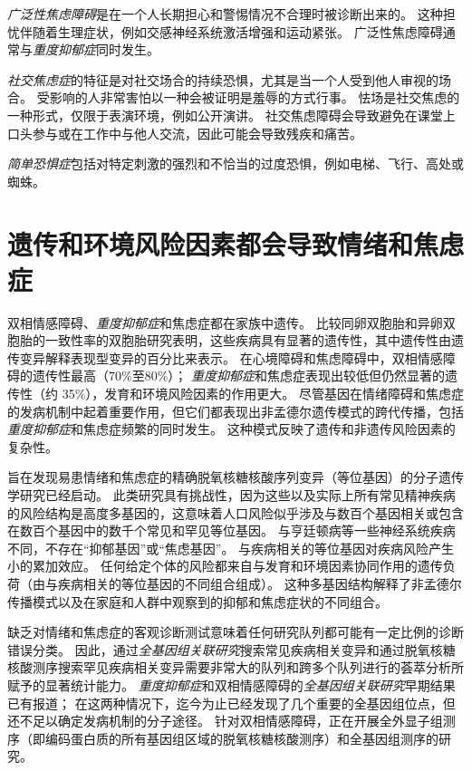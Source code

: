 \textit{广泛性焦虑障碍}是在一个人长期担心和警惕情况不合理时被诊断出来的。
这种担忧伴随着生理症状，例如交感神经系统激活增强和运动紧张。
广泛性焦虑障碍通常与\textit{重度抑郁症}同时发生。


\textit{社交焦虑症}的特征是对社交场合的持续恐惧，尤其是当一个人受到他人审视的场合。
受影响的人非常害怕以一种会被证明是羞辱的方式行事。
怯场是社交焦虑的一种形式，仅限于表演环境，例如公开演讲。
社交焦虑障碍会导致避免在课堂上口头参与或在工作中与他人交流，因此可能会导致残疾和痛苦。



\textit{简单恐惧症}包括对特定刺激的强烈和不恰当的过度恐惧，例如电梯、飞行、高处或蜘蛛。



\section{遗传和环境风险因素都会导致情绪和焦虑症}

双相情感障碍、\textit{重度抑郁症}和焦虑症都在家族中遗传。
比较同卵双胞胎和异卵双胞胎的一致性率的双胞胎研究表明，这些疾病具有显著的遗传性，其中遗传性由遗传变异解释表现型变异的百分比来表示。
在心境障碍和焦虑障碍中，双相情感障碍的遗传性最高（70\%至80\%）；
\textit{重度抑郁症}和焦虑症表现出较低但仍然显著的遗传性（约 35\%），发育和环境风险因素的作用更大。
尽管基因在情绪障碍和焦虑症的发病机制中起着重要作用，但它们都表现出非孟德尔遗传模式的跨代传播，包括\textit{重度抑郁症}和焦虑症频繁的同时发生。
这种模式反映了遗传和非遗传风险因素的复杂性。


旨在发现易患情绪和焦虑症的精确脱氧核糖核酸序列变异（等位基因）的分子遗传学研究已经启动。
此类研究具有挑战性，因为这些以及实际上所有常见精神疾病的风险结构是高度多基因的，这意味着人口风险似乎涉及与数百个基因相关或包含在数百个基因中的数千个常见和罕见等位基因。
与亨廷顿病等一些神经系统疾病不同，不存在“抑郁基因”或“焦虑基因”。
与疾病相关的等位基因对疾病风险产生小的累加效应。
任何给定个体的风险都来自与发育和环境因素协同作用的遗传负荷（由与疾病相关的等位基因的不同组合组成）。
这种多基因结构解释了非孟德尔传播模式以及在家庭和人群中观察到的抑郁和焦虑症状的不同组合。


缺乏对情绪和焦虑症的客观诊断测试意味着任何研究队列都可能有一定比例的诊断错误分类。
因此，通过\textit{全基因组关联研究}搜索常见疾病相关变异和通过脱氧核糖核酸测序搜索罕见疾病相关变异需要非常大的队列和跨多个队列进行的荟萃分析所赋予的显著统计能力。
\textit{重度抑郁症}和双相情感障碍的\textit{全基因组关联研究}早期结果已有报道；
在这两种情况下，迄今为止已经发现了几个重要的全基因组位点，但还不足以确定发病机制的分子途径。
针对双相情感障碍，正在开展全外显子组测序（即编码蛋白质的所有基因组区域的脱氧核糖核酸测序）和全基因组测序的研究。



